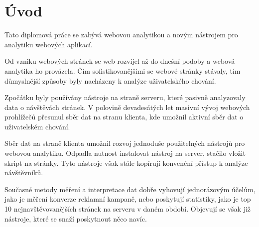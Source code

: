 \documentclass[bc,male,java,dept456]{diploma}						%
\begin{document}
\MakeTitlePages

\tableofcontents
\cleardoublepage	%

\listoftables
\cleardoublepage	%

\listoffigures
\cleardoublepage	%


\lstlistoflistings
\cleardoublepage	%










\section{Úvod}
\label{sec:Uvod}


Tato diplomová práce se zabývá webovou analytikou a novým nástrojem pro analytiku webových aplikací. 

Od vzniku webových stránek se web rozvíjel až do dnešní podoby a webová analytika\cite{kaushik} ho provázela. Čím sofistikovanějšími se webové stránky stávaly, tím důmyslnější způsoby byly nacházeny k analýze uživatelského chování.

Zpočátku byly používány nástroje na straně serveru, které pasivně analyzovaly data o návštěvách stránek. V polovině devadesátých let masivní vývoj webových prohlížečů přesunul sběr dat na stranu klienta, kde umožnil aktivní sběr dat o uživatelském chování.

Sběr dat na straně klienta umožnil rozvoj jednoduše použitelných nástrojů pro webovou analytiku. Odpadla nutnost instalovat nástroj na server, stačilo vložit skript na stránky. Tyto nástroje však stále kopírují konvenční přístup k analýze návštěvníků.

Současné metody měření a interpretace dat dobře vyhovují jednorázovým účelům, jako je měření konverze reklamní kampaně, nebo poskytují statistiky, jako je top 10 nejnavštěvovanějších stránek na serveru v daném období. Objevují se však již nástroje, které se snaží poskytnout něco navíc.
\end{document}
